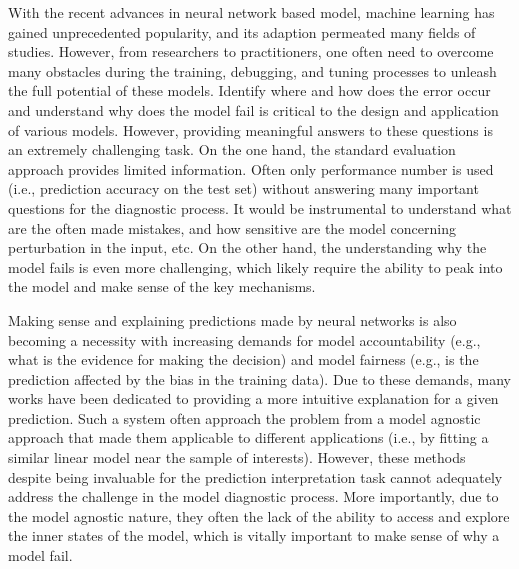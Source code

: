 \maketitle

With the recent advances in neural network based model, machine learning has
gained unprecedented popularity, and its adaption permeated many fields of studies.
%
However, from researchers to practitioners, one often need to overcome many
obstacles during the training, debugging, and tuning processes to unleash
the full potential of these models.
%
Identify where and how does the error occur and understand why does the model
fail is critical to the design and application of various models.
However, providing meaningful answers to these questions is an extremely challenging task.
On the one hand, the standard evaluation approach provides limited information. Often only performance number is used (i.e., prediction accuracy on the test set) without answering many important questions for the diagnostic process. It would be instrumental to understand what are the often made mistakes, and how sensitive are the model concerning perturbation in the input, etc. On the other hand, the understanding why the model fails is even more challenging, which likely require the ability to peak into the model and make sense of the key mechanisms.

Making sense and explaining predictions made by neural networks is also becoming a necessity with increasing demands for model accountability (e.g., what is the evidence for making the decision) and model fairness (e.g., is the prediction affected by the bias in the training data).
%
Due to these demands, many works have been dedicated to providing a more intuitive explanation for a given prediction. Such a system often approach the problem from a model agnostic approach that made them applicable to different applications (i.e., by fitting a similar linear model near the sample of interests).
%
However, these methods despite being invaluable for the prediction interpretation task cannot adequately address the challenge in the model diagnostic process. More importantly, due to the model agnostic nature, they often the lack of the ability to access and explore the inner states of the model, which is vitally important to make sense of why a model fail.

